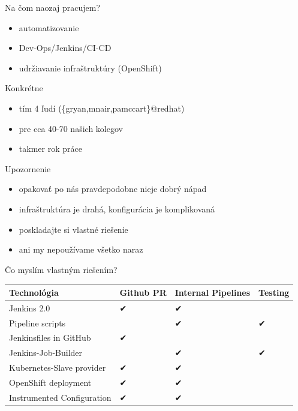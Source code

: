 \documentclass[bigger]{beamer}
\begin{document}
\begin{frame}[label={sec:org1b9a421}]{Na čom naozaj pracujem?}
\begin{itemize}
\item automatizovanie
\item Dev-Ops/Jenkins/CI-CD
\item udržiavanie infraštruktúry (OpenShift)
\end{itemize}
\end{frame}

\begin{frame}[label={sec:org28a5314}]{Konkrétne}
\begin{itemize}
\item tím 4 ľudí (\{gryan,mnair,pamccart\}@redhat)
\item pre cca 40-70 našich kolegov
\item takmer rok práce
\end{itemize}
\end{frame}

\begin{frame}[label={sec:org491a002}]{Upozornenie}
\begin{itemize}
\item opakovať po nás pravdepodobne nieje dobrý nápad
\item infraštruktúra je drahá, konfigurácia je komplikovaná
\item poskladajte si vlastné riešenie
\item ani my nepoužívame všetko naraz
\end{itemize}
\end{frame}

\begin{frame}[label={sec:orgb4d6ae7}]{Čo myslím vlastným riešením?}
\begin{center}
\begin{tabular}{llll}
Technológia & Github PR & Internal Pipelines & Testing\\
\hline
Jenkins 2.0 & ✔ & ✔ & \\
Pipeline scripts &  & ✔ & ✔\\
Jenkinsfiles in GitHub & ✔ &  & \\
Jenkins-Job-Builder &  & ✔ & ✔\\
Kubernetes-Slave provider & ✔ & ✔ & \\
OpenShift deployment & ✔ & ✔ & \\
Instrumented Configuration & ✔ & ✔ & \\
\end{tabular}
\end{center}
\end{frame}
\end{document}
